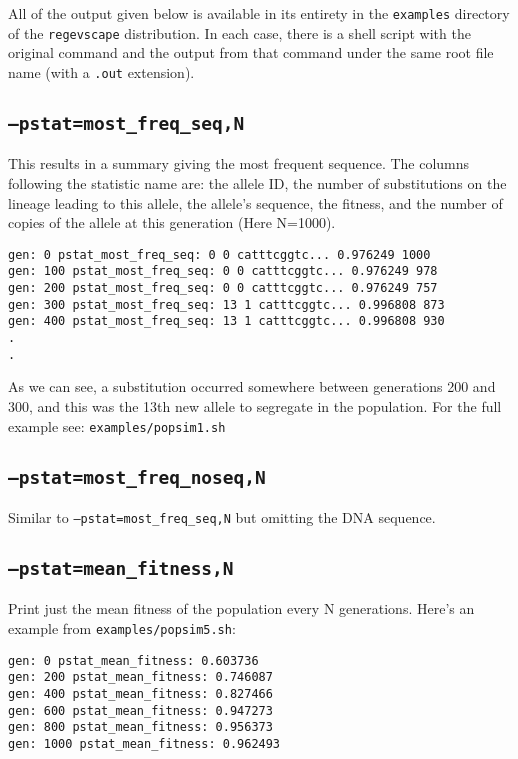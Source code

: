 \documentclass[11pt]{article}
\begin{document}
All of the output given below is available in its entirety in the \texttt{examples} directory of the \texttt{regevscape} distribution. In each case, there is a shell script with the original command and the output from that command under the same root file name (with a \texttt{.out} extension).

\subsection{\texttt{--pstat=most\_freq\_seq,N}}

This results in a summary giving the most frequent sequence. The columns following the statistic name are: the allele ID, the number of substitutions on the lineage leading to this allele, the allele's sequence, the fitness, and the number of copies of the allele at this generation (Here N=1000).

\begin{verbatim}
gen: 0 pstat_most_freq_seq: 0 0 catttcggtc... 0.976249 1000
gen: 100 pstat_most_freq_seq: 0 0 catttcggtc... 0.976249 978
gen: 200 pstat_most_freq_seq: 0 0 catttcggtc... 0.976249 757
gen: 300 pstat_most_freq_seq: 13 1 catttcggtc... 0.996808 873
gen: 400 pstat_most_freq_seq: 13 1 catttcggtc... 0.996808 930
.
.
\end{verbatim}

As we can see, a substitution occurred somewhere between generations 200 and 300, and this was the 13th new allele to segregate in the population. For the full example see: \texttt{examples/popsim1.sh}

\subsection{\texttt{--pstat=most\_freq\_noseq,N}}

Similar to \texttt{--pstat=most\_freq\_seq,N} but omitting the DNA sequence.

\subsection{\texttt{--pstat=mean\_fitness,N}}
Print just the mean fitness of the population every N generations. Here's an example from \texttt{examples/popsim5.sh}:

\begin{verbatim}
gen: 0 pstat_mean_fitness: 0.603736
gen: 200 pstat_mean_fitness: 0.746087
gen: 400 pstat_mean_fitness: 0.827466
gen: 600 pstat_mean_fitness: 0.947273
gen: 800 pstat_mean_fitness: 0.956373
gen: 1000 pstat_mean_fitness: 0.962493
\end{verbatim}
\end{document}
